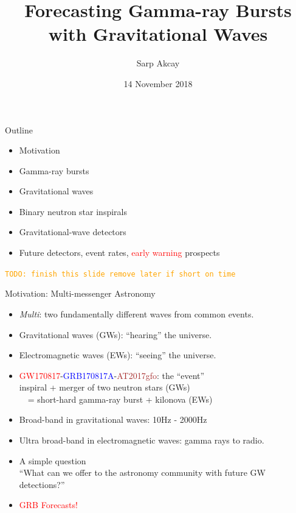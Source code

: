 \documentclass[xcolor=dvipsnames,handout,t]{beamer}
\title[] %
\title[Forecasting GRBs w/ GWs] %
{Forecasting Gamma-ray Bursts with Gravitational Waves}
\subtitle{\todo{Add background image}} %
\author[Sarp Akcay]{Sarp Akcay\inst{1}\inst{2} }
\institute[FSU Jena - UCD] %
{
  \inst{1}%
  FSU Jena %
  \inst{2}%
  University College Dublin
  }
\date[Sabanci University]{14 November 2018}
\newcommand{\todo}[1]{\textcolor{orange}{\texttt{TODO: #1}}}
\newcommand{\red}[1]{\textcolor{red}{#1}}
\newcommand{\bl}[1]{\textcolor{blue}{#1}}
\begin{document}
\begin{frame}
 \titlepage
\end{frame}

\begin{frame}{Outline}
\begin{itemize}
 \item Motivation
 \item Gamma-ray bursts
 \item Gravitational waves
 \item Binary neutron star inspirals
 \item Gravitational-wave detectors
 \item Future detectors, event rates, \red{early warning} prospects
\end{itemize}
\todo{finish this slide remove later if short on time}

 
\end{frame}


\begin{frame}{Motivation: Multi-messenger Astronomy}
  \begin{itemize}
    \item \emph{Multi}: two fundamentally different waves from common events.
    \item[]\quad Gravitational waves (GWs): ``hearing''  the universe.
    \item[]\quad Electromagnetic waves (EWs): ``seeing'' the universe.
    \item \red{GW170817}-\bl{GRB170817A}-\textcolor{brown}{AT2017gfo}: the ``event'' \\
    \quad inspiral + merger of two neutron stars (GWs) \\
    \ \ = short-hard gamma-ray burst + kilonova (EWs)
    \item[] Broad-band in gravitational waves: 10Hz - 2000Hz
    \item[] Ultra broad-band in electromagnetic waves: gamma rays to radio.
    \item A simple question \\
    {\small ``What can we offer to the astronomy community with future GW detections?''}
    \item[] \red{GRB Forecasts!}
  \end{itemize}
\end{frame}
\end{document}
